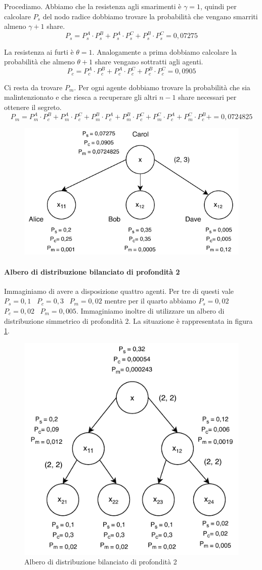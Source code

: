 Procediamo. Abbiamo che la resistenza agli smarimenti è $ \gamma = 1 $, quindi per calcolare $ P_s $ del nodo
radice dobbiamo trovare la probabilità che vengano smarriti almeno $ \gamma + 1 $ share.
$$ P_s = P_s^A \cdot P_s^B + P_s^A \cdot P_s^C + P_s^B \cdot P_s^C = 0,07275 $$

La resistenza ai furti è $ \theta = 1 $. Analogamente a prima dobbiamo calcolare la probabilità che
almeno $ \theta + 1 $ share vengano sottratti agli agenti.
$$ P_c = P_c^A \cdot P_c^B + P_c^A \cdot P_c^C + P_c^B \cdot P_c^C = 0,0905 $$

Ci resta da trovare $ P_m $. Per ogni agente dobbiamo trovare la probabilità che sia malintenzionato e che riesca
a recuperare gli altri $ n - 1 $ share necessari per ottenere il segreto.
$$ P_m =
	P_m^A \cdot P_c^B + P_m^A \cdot P_c^C +
	P_m^B \cdot P_c^A + P_m^B \cdot P_c^C +
	P_m^C \cdot P_c^A + P_m^C \cdot P_c^B +
	= 0,0724825 $$

\begin{figure}[H]
	\centering
	\includegraphics[width=0.6\linewidth]{images/chap_analisi_robustezza/robustezza-1.pdf}
\end{figure}

\paragraph{Albero di distribuzione bilanciato di profondità 2}
Immaginiamo di avere a disposizione quattro agenti. Per tre di questi
vale
$ P_s = 0,1 $ \,
$ P_c = 0,3 $ \,
$ P_m = 0,02 $
mentre per il quarto abbiamo
$ P_s = 0,02 $ \,
$ P_c = 0,02 $ \,
$ P_m = 0,005 $.
Immaginiamo inoltre di utilizzare un albero di distribuzione simmetrico di profondità 2.
La situazione è rappresentata in figura \ref{fig:robustezza-2-1}.

\begin{figure}[H]
	\centering
	\includegraphics[width=0.55\linewidth]{images/chap_analisi_robustezza/robustezza-2-1.pdf}
	\caption{Albero di distribuzione bilanciato di profondità 2}
	\label{fig:robustezza-2-1}
\end{figure}

